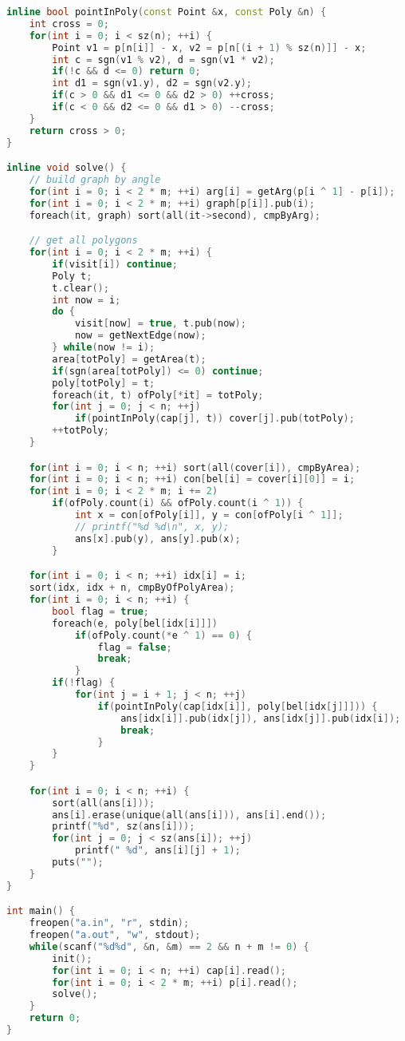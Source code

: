 \begin{lstlisting}[language=c++]
inline bool pointInPoly(const Point &x, const Poly &n) {
	int cross = 0;
	for(int i = 0; i < sz(n); ++i) {
		Point v1 = p[n[i]] - x, v2 = p[n[(i + 1) % sz(n)]] - x;
		int c = sgn(v1 % v2), d = sgn(v1 * v2);
		if(!c && d <= 0) return 0;
		int d1 = sgn(v1.y), d2 = sgn(v2.y);
		if(c > 0 && d1 <= 0 && d2 > 0) ++cross;
		if(c < 0 && d2 <= 0 && d1 > 0) --cross;
	}
	return cross > 0;
}

inline void solve() {
	// build graph by angle
	for(int i = 0; i < 2 * m; ++i) arg[i] = getArg(p[i ^ 1] - p[i]);
	for(int i = 0; i < 2 * m; ++i) graph[p[i]].pub(i);
	foreach(it, graph) sort(all(it->second), cmpByArg);

	// get all polygons
	for(int i = 0; i < 2 * m; ++i) {
		if(visit[i]) continue;
		Poly t;
		t.clear();
		int now = i;
		do {
			visit[now] = true, t.pub(now);
			now = getNextEdge(now); 
		} while(now != i);
		area[totPoly] = getArea(t);
		if(sgn(area[totPoly]) <= 0) continue;
		poly[totPoly] = t;
		foreach(it, t) ofPoly[*it] = totPoly;
		for(int j = 0; j < n; ++j)
			if(pointInPoly(cap[j], t)) cover[j].pub(totPoly);
		++totPoly;
	}

	for(int i = 0; i < n; ++i) sort(all(cover[i]), cmpByArea);
	for(int i = 0; i < n; ++i) con[bel[i] = cover[i][0]] = i;
	for(int i = 0; i < 2 * m; i += 2)
		if(ofPoly.count(i) && ofPoly.count(i ^ 1)) {
			int x = con[ofPoly[i]], y = con[ofPoly[i ^ 1]];
			// printf("%d %d\n", x, y);
			ans[x].pub(y), ans[y].pub(x);
		}

	for(int i = 0; i < n; ++i) idx[i] = i;
	sort(idx, idx + n, cmpByOfPolyArea);
	for(int i = 0; i < n; ++i) {
		bool flag = true;
		foreach(e, poly[bel[idx[i]]])
			if(ofPoly.count(*e ^ 1) == 0) {
				flag = false;
				break;
			}
		if(!flag) {
			for(int j = i + 1; j < n; ++j)
				if(pointInPoly(cap[idx[i]], poly[bel[idx[j]]])) {
					ans[idx[i]].pub(idx[j]), ans[idx[j]].pub(idx[i]);
					break;
				}
		}
	}

	for(int i = 0; i < n; ++i) {
		sort(all(ans[i]));
		ans[i].erase(unique(all(ans[i])), ans[i].end());
		printf("%d", sz(ans[i]));
		for(int j = 0; j < sz(ans[i]); ++j)
			printf(" %d", ans[i][j] + 1);
		puts("");
	}
}

int main() {
	freopen("a.in", "r", stdin);
	freopen("a.out", "w", stdout);
	while(scanf("%d%d", &n, &m) == 2 && n + m != 0) {
		init();
		for(int i = 0; i < n; ++i) cap[i].read();
		for(int i = 0; i < 2 * m; ++i) p[i].read();
		solve();
	}
	return 0;
}


\end{lstlisting}
